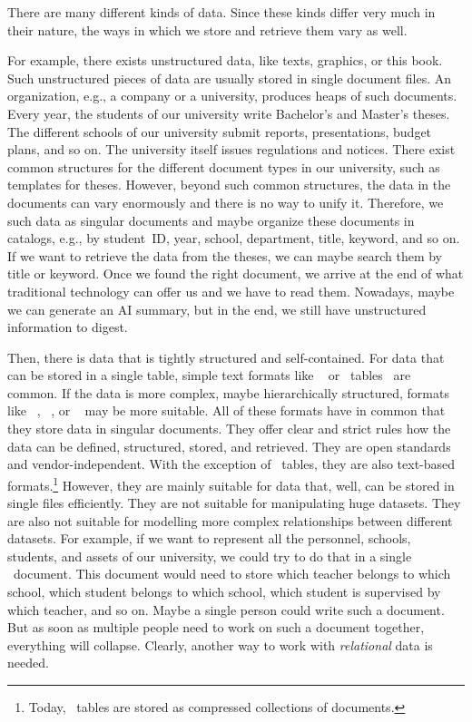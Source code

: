 \hsection{}%
%
%
There are many different kinds of data.%
Since these kinds differ very much in their nature, the ways in which we store and retrieve them vary as well.

For example, there exists unstructured data, like texts, graphics, or this book.
Such unstructured pieces of data are usually stored in single document files.
An organization, e.g., a company or a university, produces heaps of such documents.
Every year, the students of our university write Bachelor's and Master's theses.
The different schools of our university submit reports, presentations, budget plans, and so on.
The university itself issues regulations and notices.
There exist common structures for the different document types in our university, such as templates for theses.
However, beyond such common structures, the data in the documents can vary enormously and there is no way to unify it.
Therefore, we  such data as singular documents and maybe organize these documents in catalogs, e.g., by student~ID, year, school, department, title, keyword, and so on.
If we want to retrieve the data from the theses, we can maybe search them by title or keyword.
Once we found the right document, we arrive at the end of what traditional technology can offer us and we have to read them.
Nowadays, maybe we can generate an AI summary, but in the end, we still have unstructured information to digest.

Then, there is data that is tightly structured and self-contained.
For data that can be stored in a single table, simple text formats like ~\cite{RFC4180} or \microsoftExcel\ tables~\cite{B2023DMWME,G2024ECRFMME} are common.
If the data is more complex, maybe hierarchically structured, formats like ~\cite{BPSMM2008EMLX1FE,K2019ITXJY,CH2013XFCAMLTMC}, ~\cite{E2017SE4TJDIS,RFC8259}, or ~\cite{DNMAASBE2021YAMLYV1,K2019ITXJY,CGTYB2022YFFDCAIE} may be more suitable.
All of these formats have in common that they store data in singular documents.
They offer clear and strict rules how the data can be defined, structured, stored, and retrieved.
They are open standards and vendor-independent.
With the exception of \microsoftExcel\ tables, they are also text-based formats.\footnote{%
Today, \microsoftExcel\ tables are stored as compressed collections of  documents.%
} %
However, they are mainly suitable for data that, well, can be stored in single files efficiently.
They are not suitable for manipulating huge datasets.
They are also not suitable for modelling more complex relationships between different datasets.
For example, if we want to represent all the personnel, schools, students, and assets of our university, we could try to do that in a single ~document.
This document would need to store which teacher belongs to which school, which student belongs to which school, which student is supervised by which teacher, and so on.
Maybe a single person could write such a document.
But as soon as multiple people need to work on such a document together, everything will collapse.
Clearly, another way to work with \emph{relational} data is needed.

